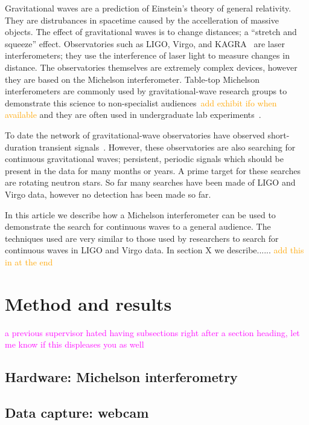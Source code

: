 \documentclass[prb,preprint]{revtex4-1}
\newcommand{\jam}{\textcolor{magenta}}
\newcommand{\han}{\textcolor{orange}}
\begin{document}
Gravitational waves are a prediction of Einstein's theory of general relativity. 
They are distrubances in spacetime caused by the accelleration of massive objects. 
The effect of gravitational waves is to change distances; a ``stretch and squeeze'' effect. 
Observatories such as LIGO, Virgo, and KAGRA~\cite{KAGRA:2013} are laser interferometers; they use the interference of laser light to measure changes in distance. 
The observatories themselves are extremely complex devices, however they are based on the Michelson interferometer. 
Table-top Michelson interferometers are commonly used by gravitational-wave research groups to demonstrate this science to non-specialist audiences~\cite{ThorLabsIFO,NikhefIFO}\han{add exhibit ifo when available} and they are often used in undergraduate lab experiments~\cite{UgoliniEtAl:2019}. 


To date the network of gravitational-wave observatories have observed short-duration transient signals~\cite{GWTC-1:2018,GWOSC:online}. 
However, these observatories are also searching for continuous gravitational waves; persistent, periodic signals which should be present in the data for many months or years. 
A prime target for these searches are rotating neutron stars. 
So far many searches have been made of LIGO and Virgo data, however no detection has been made so far.


In this article we describe how a Michelson interferometer can be used to demonstrate the search for continuous waves to a general audience. 
The techniques used are very similar to those used by researchers to search for continuous waves in LIGO and Virgo data. 
In section X we describe...... \han{add this in at the end}


\section{Method and results}
\jam{a previous supervisor hated having subsections right after a section heading, let me know if this displeases you as well}

\subsection{Hardware: Michelson interferometry}

\subsection{Data capture: webcam}
\end{document}

